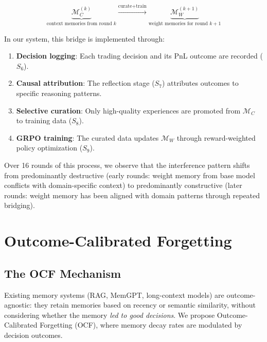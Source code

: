 \documentclass[11pt, a4paper]{article}
\begin{document}
\begin{equation}
  \underbrace{\mathcal{M}_C^{(k)}}_{\text{context memories from round } k} \xrightarrow{\text{curate} + \text{train}} \underbrace{\mathcal{M}_W^{(k+1)}}_{\text{weight memories for round } k{+}1}
\end{equation}

In our system, this bridge is implemented through:
\begin{enumerate}
  \item \textbf{Decision logging}: Each trading decision and its PnL outcome are recorded ($S_6$).
  \item \textbf{Causal attribution}: The reflection stage ($S_7$) attributes outcomes to specific reasoning patterns.
  \item \textbf{Selective curation}: Only high-quality experiences are promoted from $\mathcal{M}_C$ to training data ($S_8$).
  \item \textbf{GRPO training}: The curated data updates $\mathcal{M}_W$ through reward-weighted policy optimization ($S_9$).
\end{enumerate}

Over 16 rounds of this process, we observe that the interference pattern shifts from predominantly destructive (early rounds: weight memory from base model conflicts with domain-specific context) to predominantly constructive (later rounds: weight memory has been aligned with domain patterns through repeated bridging).


\section{Outcome-Calibrated Forgetting}
\label{sec:ocf}

\subsection{The OCF Mechanism}

Existing memory systems (RAG, MemGPT, long-context models) are outcome-agnostic: they retain memories based on recency or semantic similarity, without considering whether the memory \emph{led to good decisions}. We propose Outcome-Calibrated Forgetting (OCF), where memory decay rates are modulated by decision outcomes.
\end{document}
